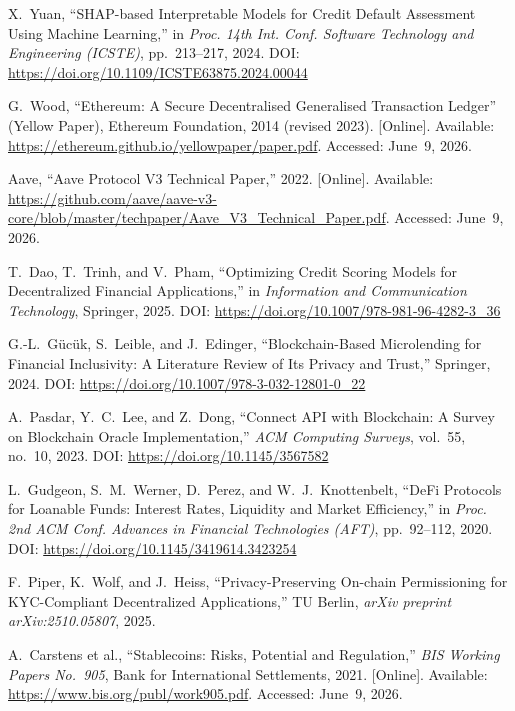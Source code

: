 \documentclass[12pt, a4paper]{report}
\begin{document}
{\begin{enumerate}[label={[\arabic*]}]
\item X.~Yuan, ``SHAP-based Interpretable Models for Credit Default Assessment Using Machine Learning,'' in \textit{Proc. 14th Int. Conf. Software Technology and Engineering (ICSTE)}, pp.~213--217, 2024. DOI: \url{https://doi.org/10.1109/ICSTE63875.2024.00044}

\item G.~Wood, ``Ethereum: A Secure Decentralised Generalised Transaction Ledger'' (Yellow Paper), Ethereum Foundation, 2014 (revised 2023). [Online]. Available: \url{https://ethereum.github.io/yellowpaper/paper.pdf}. Accessed: June~9, 2026.

\item Aave, ``Aave Protocol V3 Technical Paper,'' 2022. [Online]. Available: \url{https://github.com/aave/aave-v3-core/blob/master/techpaper/Aave_V3_Technical_Paper.pdf}. Accessed: June~9, 2026.

\item T.~Dao, T.~Trinh, and V.~Pham, ``Optimizing Credit Scoring Models for Decentralized Financial Applications,'' in \textit{Information and Communication Technology}, Springer, 2025. DOI: \url{https://doi.org/10.1007/978-981-96-4282-3_36}

\item G.-L.~G\"{u}c\"{u}k, S.~Leible, and J.~Edinger, ``Blockchain-Based Microlending for Financial Inclusivity: A Literature Review of Its Privacy and Trust,'' Springer, 2024. DOI: \url{https://doi.org/10.1007/978-3-032-12801-0_22}

\item A.~Pasdar, Y.~C.~Lee, and Z.~Dong, ``Connect API with Blockchain: A Survey on Blockchain Oracle Implementation,'' \textit{ACM Computing Surveys}, vol.~55, no.~10, 2023. DOI: \url{https://doi.org/10.1145/3567582}

\item L.~Gudgeon, S.~M.~Werner, D.~Perez, and W.~J.~Knottenbelt, ``DeFi Protocols for Loanable Funds: Interest Rates, Liquidity and Market Efficiency,'' in \textit{Proc. 2nd ACM Conf. Advances in Financial Technologies (AFT)}, pp.~92--112, 2020. DOI: \url{https://doi.org/10.1145/3419614.3423254}

\item F.~Piper, K.~Wolf, and J.~Heiss, ``Privacy-Preserving On-chain Permissioning for KYC-Compliant Decentralized Applications,'' TU Berlin, \textit{arXiv preprint arXiv:2510.05807}, 2025.

\item A.~Carstens et al., ``Stablecoins: Risks, Potential and Regulation,'' \textit{BIS Working Papers No.~905}, Bank for International Settlements, 2021. [Online]. Available: \url{https://www.bis.org/publ/work905.pdf}. Accessed: June~9, 2026.


\end{enumerate}}
\end{document}
